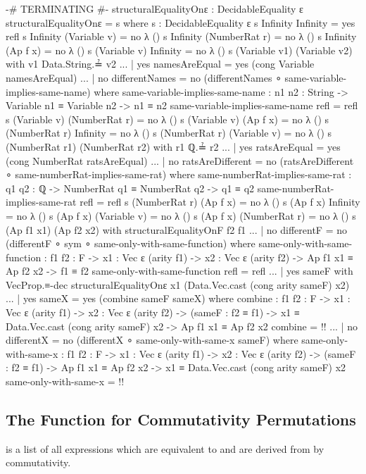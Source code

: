 \documentclass{report}
\begin{document}
\begin{code}
{-# TERMINATING #-}
structuralEqualityOnε : DecidableEquality ε
structuralEqualityOnε = s
  where
  s : DecidableEquality ε
  s Infinity Infinity = yes refl
  s Infinity (Variable v) = no λ ()
  s Infinity (NumberRat r) = no λ ()
  s Infinity (Ap f x) = no λ ()
  s (Variable v) Infinity = no λ ()
  s (Variable v1) (Variable v2) with v1 Data.String.≟ v2
  ... | yes namesAreEqual = yes (cong Variable namesAreEqual)
  ... | no differentNames = no (differentNames ∘ same-variable-implies-same-name)
    where
    same-variable-implies-same-name :
      {n1 n2 : String} ->
      Variable n1 ≡ Variable n2 ->
      n1 ≡ n2
    same-variable-implies-same-name refl = refl
  s (Variable v) (NumberRat r) = no λ ()
  s (Variable v) (Ap f x) = no λ ()
  s (NumberRat r) Infinity = no λ ()
  s (NumberRat r) (Variable v) = no λ ()
  s (NumberRat r1) (NumberRat r2) with r1 ℚ.≟ r2
  ... | yes ratsAreEqual = yes (cong NumberRat ratsAreEqual)
  ... | no ratsAreDifferent = no (ratsAreDifferent ∘ same-numberRat-implies-same-rat)
    where
    same-numberRat-implies-same-rat :
      {q1 q2 : ℚ} ->
      NumberRat q1 ≡ NumberRat q2 ->
      q1 ≡ q2
    same-numberRat-implies-same-rat refl = refl
  s (NumberRat r) (Ap f x) = no λ ()
  s (Ap f x) Infinity = no λ ()
  s (Ap f x) (Variable v) = no λ ()
  s (Ap f x) (NumberRat r) = no λ ()
  s (Ap f1 x1) (Ap f2 x2) with structuralEqualityOnF f2 f1
  ... | no differentF = no (differentF ∘ sym ∘ same-only-with-same-function)
    where
    same-only-with-same-function :
      {f1 f2 : F} ->
      {x1 : Vec ε (arity f1)} ->
      {x2 : Vec ε (arity f2)} ->
      Ap f1 x1 ≡ Ap f2 x2 ->
      f1 ≡ f2
    same-only-with-same-function refl = refl
  ... | yes sameF with VecProp.≡-dec structuralEqualityOnε x1 (Data.Vec.cast (cong arity sameF) x2)
  ... | yes sameX = yes (combine sameF sameX)
    where
    combine :
      {f1 f2 : F} ->
      {x1 : Vec ε (arity f1)} ->
      {x2 : Vec ε (arity f2)} ->
      (sameF : f2 ≡ f1) ->
      x1 ≡ Data.Vec.cast (cong arity sameF) x2 ->
      Ap f1 x1 ≡ Ap f2 x2
    combine = {!!}
  ... | no differentX = no (differentX ∘ same-only-with-same-x sameF)
    where
    same-only-with-same-x :
      {f1 f2 : F} ->
      {x1 : Vec ε (arity f1)} ->
      {x2 : Vec ε (arity f2)} ->
      (sameF : f2 ≡ f1) ->
      Ap f1 x1 ≡ Ap f2 x2 ->
      x1 ≡ Data.Vec.cast (cong arity sameF) x2
    same-only-with-same-x = {!!}
\end{code}

\subsection{The Function for Commutativity Permutations}
  is a list of all expressions which are equivalent to  and are derived from  by commutativity.
\end{document}
